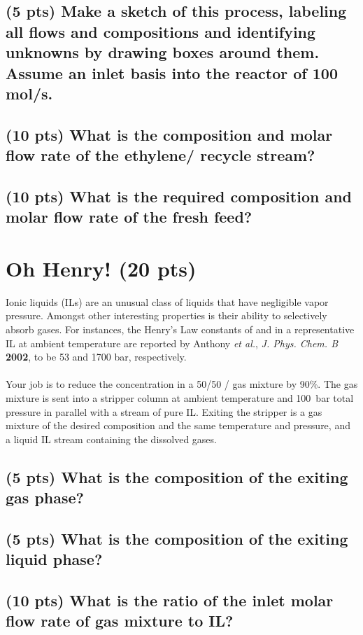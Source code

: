 \documentclass[11pt]{article}
\begin{document}
\subsection{(5 pts) Make a sketch of this process, labeling all flows and compositions and identifying unknowns by drawing boxes around them. Assume an inlet basis into the reactor of 100 mol/s.}
\label{sec-2-2}
\newpage
\subsection{(10 pts) What is the composition and molar flow rate of the ethylene/ recycle stream?}
\label{sec-2-3}
\vspace{10cm}
\subsection{(10 pts) What is the required composition and molar flow rate of the fresh feed?}
\label{sec-2-4}
\newpage
\section{Oh Henry! (20 pts)}
\label{sec-3}
Ionic liquids (ILs) are an unusual class of liquids that have negligible vapor pressure. Amongst other interesting properties is their ability to selectively absorb  gases.  For instances, the Henry's Law constants of  and  in a representative IL at ambient temperature are reported by Anthony \textit{et al.}, \emph{J. Phys. Chem. B} \textbf{2002}, to be 53 and 1700 bar, respectively.
\\ \\
Your job is to reduce the  concentration in a 50/50 / gas mixture by 90\%.  The gas mixture is sent into a stripper column at ambient temperature and 100~bar total pressure in parallel with a stream of pure IL.  Exiting the stripper is a gas mixture of the desired composition and the same temperature and pressure, and a liquid IL stream containing the dissolved gases.
\subsection{(5 pts) What is the composition of the exiting gas phase?}
\label{sec-3-1}
\vspace{3cm}
\subsection{(5 pts) What is the composition of the exiting liquid phase?}
\label{sec-3-2}
\vspace{4cm}
\subsection{(10 pts) What is the ratio of the inlet molar flow rate of gas mixture to IL?}
\label{sec-3-3}
\end{document}
